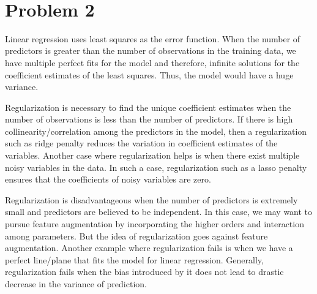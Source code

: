 \documentclass[11pt]{article}
\begin{document}
\begin{center}

\ \\
\end{center}

\section*{Problem 2}

\vspace{5 mm}
\noindent
Linear regression uses least squares as the error function. When the number of 
predictors is greater than the number of observations in the training data, we 
have multiple perfect fits for the model and therefore, infinite solutions for 
the coefficient estimates of the least squares. Thus, the model would have a 
huge variance.

\vspace{5 mm}
\noindent
Regularization is necessary to find the unique coefficient estimates when the 
number of observations is less than the number of predictors. If there is high 
collinearity/correlation among the predictors in the model, then a 
regularization such as ridge penalty reduces the variation in coefficient 
estimates of the variables. Another case where regularization helps is when 
there exist multiple noisy variables in the data. In such a case, 
regularization such as a lasso penalty ensures that the coefficients of noisy 
variables are zero.

\vspace{5 mm}
\noindent
Regularization is disadvantageous when the number of predictors is extremely 
small and predictors are believed to be  independent. In this case, we may want 
to pursue feature augmentation by incorporating the higher orders and 
interaction among parameters. But the idea of regularization goes against 
feature augmentation. Another example where regularization fails is when we 
have a perfect line/plane that fits the model for linear regression. Generally, 
regularization fails when the bias introduced by it does not lead to drastic 
decrease in the variance of prediction. 
\end{document}
